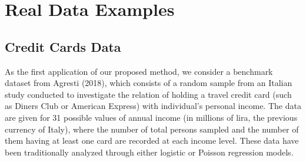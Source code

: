 \documentclass[a4paper]{article}%
\begin{document}
%	


\section{Real Data Examples}

\subsection{Credit Cards Data}

As the first application of our proposed method, we consider a benchmark dataset from Agresti (2018),
which consists of a random sample from an Italian study conducted to investigate 
the relation of holding a travel credit card (such as Diners Club or American Express) with individual's personal income.
The data are given for 31 possible values of annual income (in millions of lira, the previous currency of Italy),
where the number of total persons sampled and the number of them having at least one card are recorded at each income level. 
These data have been traditionally analyzed through either logistic or Poisson regression models.
\end{document}
